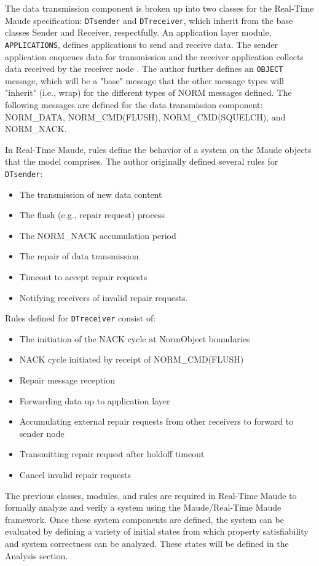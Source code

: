 \documentclass[10pt, journal]{IEEEtran}
\begin{document}
The data transmission component is broken up into two classes for the Real-Time Maude specification: \texttt{DTsender} and \texttt{DTreceiver}, which inherit from the base classes Sender and Receiver, respectfully. An application layer module, \texttt{APPLICATIONS}, defines applications to send and receive data. The sender application enqueues data for transmission and the receiver application collects data received by the receiver node \cite{Lien2004}. The author further defines an \texttt{OBJECT} message, which will be a "base" message that the other message types will "inherit" (i.e., wrap) for the different types of NORM messages defined. The following messages are defined for the data transmission component: NORM\_DATA, NORM\_CMD(FLUSH), NORM\_CMD(SQUELCH), and NORM\_NACK. 

In Real-Time Maude, rules define the behavior of a system on the Maude objects that the model comprises. The author originally defined several rules for \texttt{DTsender}:
\begin{itemize}
	\item The transmission of new data content
	\item The flush (e.g., repair request) process
	\item The NORM\_NACK accumulation period
	\item The repair of data transmission
	\item Timeout to accept repair requests
	\item Notifying receivers of invalid repair requests. 
\end{itemize}
\noindent
Rules defined for \texttt{DTreceiver} consist of:
\begin{itemize}
	\item The initiation of the NACK cycle at NormObject boundaries
	\item NACK cycle initiated by receipt of NORM\_CMD(FLUSH)
	\item Repair message reception
	\item Forwarding data up to application layer
	\item Accumulating external repair requests from other receivers to forward to sender node
	\item Transmitting repair request after holdoff timeout
	\item Cancel invalid repair requests
\end{itemize}

The previous classes, modules, and rules are required in Real-Time Maude to formally analyze and verify a system using the Maude/Real-Time Maude framework. Once these system components are defined, the system can be evaluated by defining a variety of initial states from which property satisfiability and system correctness can be analyzed. These states will be defined in the Analysis section.
\end{document}
